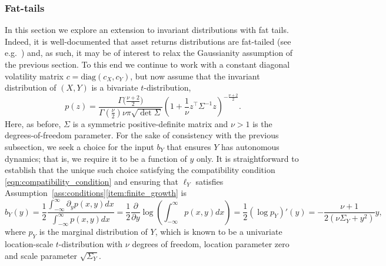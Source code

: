 \documentclass{article}
\theoremstyle{plain}
\theoremstyle{definition}
\numberwithin{lem}{section}
\begin{document}
\subsubsection{Fat-tails} \label{sec:fat_tails}
In this section we explore an extension to invariant distributions with fat tails. Indeed, it is well-documented that asset returns distributions are fat-tailed (see e.g.\ \cite{cont2001empirical}) and, as such, it may be of interest to relax the Gaussianity assumption of the previous section. To this end we continue to work with a constant diagonal volatility matrix $c = \mathrm{diag}(c_X,c_Y)$, but now assume that the invariant distribution of $(X,Y)$ is a bivariate $t$-distribution,
\[p(z) = \frac{\Gamma\big(\frac{\nu + 2}{2}\big)}{\Gamma(\frac{\nu}{2})\nu\pi\sqrt{\det \Sigma}}\left(1 + \frac{1}{\nu}z^\top \Sigma^{-1}z\right)^{-\frac{\nu + 2}{2}}.\]
Here, as before, $\Sigma$ is a symmetric positive-definite matrix and $\nu > 1$ is the degrees-of-freedom parameter. For the sake of consistency with the previous subsection, we seek a choice for the input $b_Y$ that ensures $Y$ has autonomous dynamics; that is, we require it to be a function of $y$ only. It is straightforward to establish that the unique such choice satisfying the compatibility condition \eqref{eqn:compatibility_condition} and ensuring that $\ell_Y$ satisfies Assumption~\ref{ass:conditions}\ref{item:finite_growth} is
\[b_Y(y)  = \frac{1}{2}\frac{\int_{-\infty}^\infty\partial_y p(x,y)dx}{\int_{-\infty}^\infty p(x,y)dx} = \frac{1}{2}\frac{\partial}{\partial y}\log\left(\int_{-\infty}^\infty p(x,y)dx\right) = \frac{1}{2}(\log p_Y)'(y) = -\frac{\nu + 1}{2(\nu\Sigma_Y + y^2)} y,\]
where $p_Y$ is the marginal distribution of $Y$, which is known to be a univariate location-scale $t$-distribution with $\nu$ degrees of freedom, location parameter zero and scale parameter $\sqrt{\Sigma_{Y}}$. 
\end{document}
